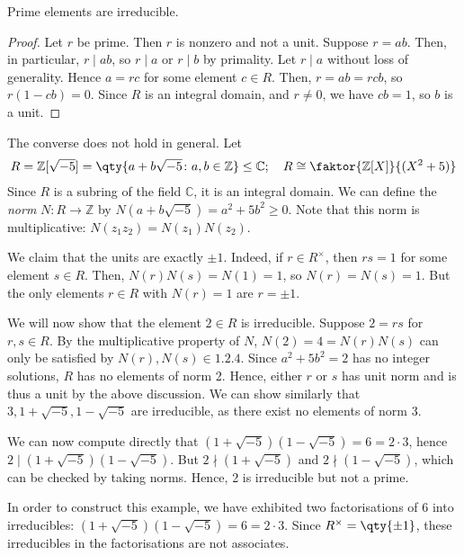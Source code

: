 \begin{lemma}
	Prime elements are irreducible.
\end{lemma}
\begin{proof}
	Let $r$ be prime.
	Then $r$ is nonzero and not a unit.
	Suppose $r = ab$.
	Then, in particular, $r \mid ab$, so $r \mid a$ or $r \mid b$ by primality.
	Let $r \mid a$ without loss of generality.
	Hence $a = rc$ for some element $c \in R$.
	Then, $r = ab = rcb$, so $r(1-cb) = 0$.
	Since $R$ is an integral domain, and $r \neq 0$, we have $cb = 1$, so $b$ is a unit.
\end{proof}
\begin{example}
	The converse does not hold in general.
	Let
	\begin{align*}
		R = \mathbb Z[\sqrt{-5}] = \qty{a+b\sqrt{-5} \colon a,b \in \mathbb Z} \leq \mathbb C;\quad R \cong \faktor{\mathbb Z[X]}{(X^2 + 5)}
	\end{align*}
	Since $R$ is a subring of the field $\mathbb C$, it is an integral domain.
	We can define the \textit{norm} $N \colon R \to \mathbb Z$ by $N(a+b\sqrt{-5}) = a^2 + 5b^2 \geq 0$.
	Note that this norm is multiplicative: $N(z_1 z_2) = N(z_1) N(z_2)$.

	We claim that the units are exactly $\pm 1$.
	Indeed, if $r \in R^\times$, then $rs = 1$ for some element $s \in R$.
	Then, $N(r) N(s) = N(1) = 1$, so $N(r) = N(s) = 1$.
	But the only elements $r \in R$ with $N(r) = 1$ are $r = \pm 1$.

	We will now show that the element $2 \in R$ is irreducible.
	Suppose $2 = rs$ for $r,s \in R$.
	By the multiplicative property of $N$, $N(2) = 4 = N(r) N(s)$ can only be satisfied by $N(r), N(s) \in \qty{1,2,4}$.
	Since $a^2 + 5b^2 = 2$ has no integer solutions, $R$ has no elements of norm 2.
	Hence, either $r$ or $s$ has unit norm and is thus a unit by the above discussion.
	We can show similarly that $3, 1 + \sqrt{-5}, 1 - \sqrt{-5}$ are irreducible, as there exist no elements of norm 3.

	We can now compute directly that $(1 + \sqrt{-5})(1-\sqrt{-5}) = 6 = 2 \cdot 3$, hence $2 \mid (1 + \sqrt{-5})(1-\sqrt{-5})$.
	But $2 \nmid (1 + \sqrt{-5})$ and $2 \nmid (1 - \sqrt{-5})$, which can be checked by taking norms.
	Hence, 2 is irreducible but not a prime.

	In order to construct this example, we have exhibited two factorisations of 6 into irreducibles: $(1 + \sqrt{-5})(1-\sqrt{-5}) = 6 = 2 \cdot 3$.
	Since $R^\times = \qty{\pm 1}$, these irreducibles in the factorisations are not associates.
\end{example}


